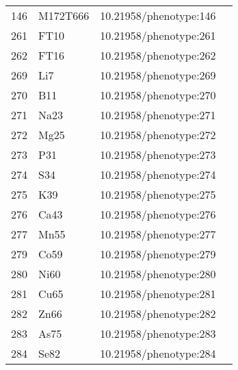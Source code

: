\begin{longtable}{p{} p{} p{} p{}}
 146 & M172T666 & 10.21958/phenotype:146 & \cite{strauch2015}\\
 261 & FT10 & 10.21958/phenotype:261 &\cite{1001genome}\\
 262 & FT16 & 10.21958/phenotype:262 &\cite{1001genome}\\
 269 & Li7 & 10.21958/phenotype:269 & \cite{ion2015}\\
 270 & B11 & 10.21958/phenotype:270 & \cite{ion2015}\\
 271 & Na23 & 10.21958/phenotype:271 & \cite{ion2015}\\
 272 & Mg25 & 10.21958/phenotype:272 & \cite{ion2015}\\
 273 & P31 & 10.21958/phenotype:273 & \cite{ion2015}\\
 274 & S34 & 10.21958/phenotype:274 & \cite{ion2015}\\
 275 & K39 & 10.21958/phenotype:275 & \cite{ion2015}\\
 276 & Ca43 & 10.21958/phenotype:276 & \cite{ion2015}\\
 277 & Mn55 & 10.21958/phenotype:277 & \cite{ion2015}\\
 279 & Co59 & 10.21958/phenotype:279 & \cite{ion2015}\\
 280 & Ni60 & 10.21958/phenotype:280 & \cite{ion2015}\\
 281 & Cu65 & 10.21958/phenotype:281 & \cite{ion2015}\\
 282 & Zn66 & 10.21958/phenotype:282 & \cite{ion2015}\\
 283 & As75 & 10.21958/phenotype:283 & \cite{ion2015}\\
 284 & Se82 & 10.21958/phenotype:284 & \cite{ion2015}\\
\bottomrule
\end{longtable}
